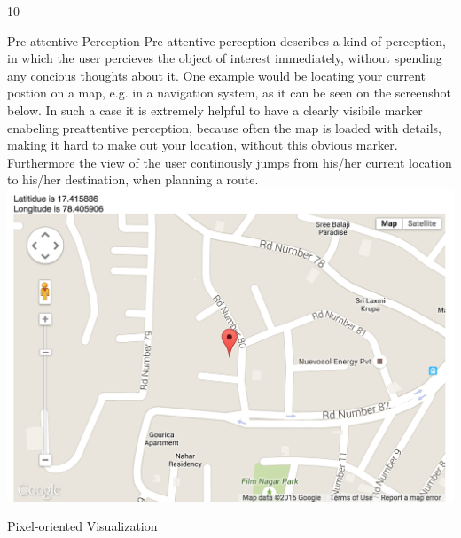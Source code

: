 \documentclass{article}
\begin{document}
\begin{ukon-infie}[24.01.18]{10}
		
		\begin{exercise}[p=2]{Pre-attentive Perception}
		\question{}
		{
		Pre-attentive perception describes a kind of perception, in which the user percieves the object of interest immediately, without spending any concious thoughts about it.
		}
		\question{}
		{
			One example would be locating your current postion on a map, e.g. in a navigation system, as it can be seen on the screenshot below. In such a case it is extremely helpful to have a clearly visibile marker enabeling preattentive perception, because often the map is loaded with details, making it hard to make out your location, without this obvious marker. Furthermore the view of the user continously jumps from his/her current location to his/her destination, when planning a route.\\
			\includegraphics[scale=0.4]{preattentive_perception.png}
		}
		\end{exercise}
		
		\begin{exercise}[p=4]{Pixel-oriented Visualization}
		
		\end{exercise}
		
		
\end{ukon-infie}
\end{document}
